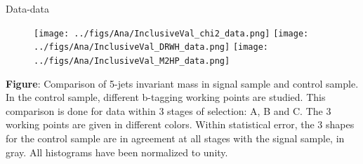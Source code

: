 \begin{frame}{Data-data}
\vspace{-.2cm}
\begin{figure}[!Hhtbp]
  \begin{center}
    \texttt{[image: ../figs/Ana/InclusiveVal\_chi2\_data.png]}
    \texttt{[image: ../figs/Ana/InclusiveVal\_DRWH\_data.png]}
    \texttt{[image: ../figs/Ana/InclusiveVal\_M2HP\_data.png]}
  \end{center}
\end{figure}

\vspace{-.2cm}
    \begin{block}{}\tiny
      \textbf{Figure}: Comparison of 5-jets invariant mass in signal sample and control sample. In the control sample, different b-tagging working points are studied. This comparison is done for data within 3 stages of selection: A, B and C. The 3 working points are given in different colors. Within statistical error, the 3 shapes for the control sample are in agreement at all stages with the signal sample, in gray. All histograms have been normalized to unity.
    \end{block}

\end{frame}


